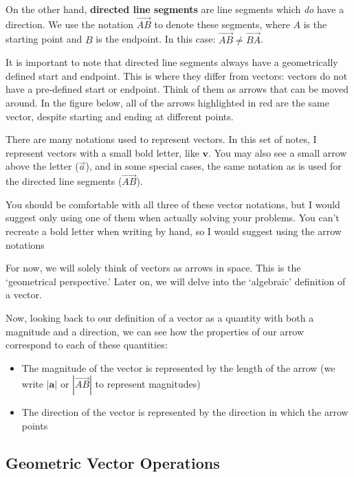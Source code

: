 \documentclass[
	11pt, %
	fleqn, %
	a4paper, %
]{../../styles/LegrandOrangeBook}
\begin{document}

On the other hand, \textbf{directed line segments} are line segments which \textit{do} have a direction. We use the notation $\overrightarrow{AB}$ to denote these segments, where $A$ is the starting point and $B$ is the endpoint. In this case: $\overrightarrow{AB} \ne \overrightarrow{BA}$.

It is important to note that directed line segments always have a geometrically defined start and endpoint. This is where they differ from vectors: vectors do not have a pre-defined start or endpoint. Think of them as arrows that can be moved around. In the figure below, all of the arrows highlighted in red are the same vector, despite starting and ending at different points. 


There are many notations used to represent vectors. In this set of notes, I represent vectors with a small bold letter, like $\mathbf{v}$. You may also see a small arrow above the letter ($\overrightarrow{a}$), and in some special cases, the same notation as is used for the directed line segments ($\overrightarrow{AB}$). 

\begin{remark}
	You should be comfortable with all three of these vector notations, but I would suggest only using one of them when actually solving your problems. You can't recreate a bold letter when writing by hand, so I would suggest using the arrow notations
\end{remark}

For now, we will solely think of vectors as arrows in space. This is the `geometrical perspective.' Later on, we will delve into the `algebraic' definition of a vector.

Now, looking back to our definition of a vector as a quantity with both a magnitude and a direction, we can see how the properties of our arrow correspond to each of these quantities:

\begin{itemize}
	\item The magnitude of the vector is represented by the length of the arrow (we write $|\mathbf{a}|$ or $|\overrightarrow{AB}|$ to represent magnitudes)
	\item The direction of the vector is represented by the direction in which the arrow points
\end{itemize}

\subsection{Geometric Vector Operations}
\end{document}
